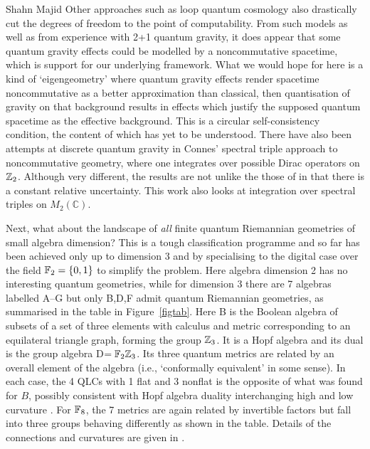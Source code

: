 \begin{artengenv}{Shahn Majid}
Other approaches such as loop quantum cosmology \parencite{Ash} also drastically cut the degrees of freedom to the point of computability. From such models as well as from experience with 2+1 quantum gravity, it does appear that some quantum gravity effects could be modelled by a noncommutative spacetime, which is support for our underlying framework. What we would hope for here is a kind of `eigengeometry' where quantum gravity effects render spacetime noncommutative as a better approximation than classical, then quantisation of gravity on that background results in effects which justify the supposed quantum spacetime as the effective background. This is a circular self-consistency condition, the content of which has yet to be understood. There have also been attempts at discrete quantum gravity in Connes' spectral triple approach to noncommutative geometry, where one integrates over possible Dirac operators \parencite{Hal} on ${\mathbb{Z}}_2$. Although very different, the results are not unlike the those of \parencite{Ma:squ,ArgMa} in that there is a constant relative uncertainty. This work also looks at integration over spectral triples on $M_2(\mathbb{C})$.

Next, what about the landscape of {\em all} finite quantum Riemannian geometries of small algebra dimension? This is a tough classification programme and so far has been achieved \parencite{MaPac2} only up to dimension 3 and by specialising to the digital case over the field ${\mathbb{F}}_2=\{0,1\}$ to simplify the problem. Here algebra dimension 2 has no interesting quantum geometries, while for dimension 3 there are 7 algebras labelled A--G but only B,D,F admit quantum Riemannian geometries, as summarised in the table in Figure~\ref{figtab}. Here B is the Boolean algebra of subsets of a set of three elements with calculus and metric corresponding to an equilateral triangle graph, forming the group ${\mathbb{Z}}_3$. It is a Hopf algebra and its dual is the group algebra D$={\mathbb{F}}_2{\mathbb{Z}}_3$. Its three quantum metrics are related by an overall element of the algebra (i.e., `conformally equivalent' in some sense). In each case, the 4 QLCs with 1 flat and 3 nonflat is the opposite of what was found for $B$, possibly consistent with Hopf algebra duality interchanging high and low curvature \parencite[cf.][]{Ma:pla,Ma:pri}. For ${\mathbb{F}}_8$, the 7 metrics are again related by invertible factors but fall into three groups behaving differently as shown in the table. Details of the connections and curvatures are given in \parencite{MaPac2}. 


\end{artengenv}
